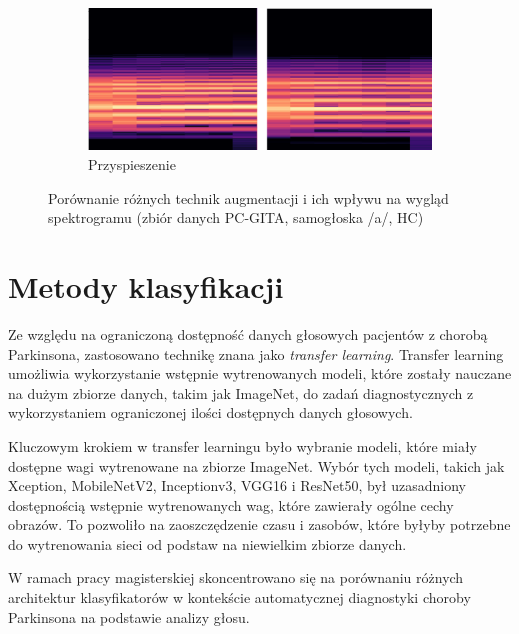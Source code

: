 \begin{figure}[ht]
    \begin{subfigure}{0.7\textwidth}
        \includegraphics[width=\linewidth]{./img/augmentation/speed}
        \caption{Przyspieszenie}
        \label{fig:speed}
    \end{subfigure}

    \caption{Porównanie różnych technik augmentacji i ich wpływu na wygląd spektrogramu (zbiór danych PC-GITA, samogłoska /a/, HC)}
    \label{fig:augumentacja}
\end{figure}


\section{Metody klasyfikacji}
\label{sec:klasyfikacja}

Ze względu na ograniczoną dostępność danych głosowych pacjentów z chorobą Parkinsona, zastosowano technikę znana jako \emph{transfer learning}.
Transfer learning umożliwia wykorzystanie wstępnie wytrenowanych modeli, które zostały nauczane na dużym zbiorze danych, takim jak ImageNet,
do zadań diagnostycznych z wykorzystaniem ograniczonej ilości dostępnych danych głosowych.

Kluczowym krokiem w transfer learningu było wybranie modeli, które miały dostępne wagi wytrenowane na zbiorze ImageNet.
Wybór tych modeli, takich jak Xception, MobileNetV2, Inceptionv3, VGG16 i ResNet50, był uzasadniony dostępnością wstępnie wytrenowanych wag, które zawierały ogólne cechy obrazów.
To pozwoliło na zaoszczędzenie czasu i zasobów, które byłyby potrzebne do wytrenowania sieci od podstaw na niewielkim zbiorze danych.

W ramach pracy magisterskiej skoncentrowano się na porównaniu różnych architektur klasyfikatorów w kontekście automatycznej diagnostyki choroby Parkinsona na podstawie analizy głosu.

